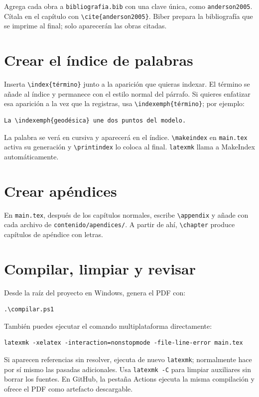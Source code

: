 Agrega cada obra a \texttt{bibliografia.bib} con una clave única, como \texttt{anderson2005}. Cítala en el capítulo con \verb|\cite{anderson2005}|. Biber prepara la bibliografía que se imprime al final; solo aparecerán las obras citadas.

\section{Crear el índice de palabras}

Inserta \verb|\index{término}| junto a la aparición que quieras indexar. El término se añade al índice y permanece con el estilo normal del párrafo. Si quieres enfatizar esa aparición a la vez que la registras, usa \verb|\indexemph{término}|; por ejemplo:

\begin{verbatim}
La \indexemph{geodésica} une dos puntos del modelo.
\end{verbatim}

La palabra se verá en cursiva y aparecerá en el índice. \verb|\makeindex| en \texttt{main.tex} activa su generación y \verb|\printindex| lo coloca al final. \texttt{latexmk} llama a MakeIndex automáticamente.

\section{Crear apéndices}

En \texttt{main.tex}, después de los capítulos normales, escribe \verb|\appendix| y añade con \verb|| cada archivo de \texttt{contenido/apendices/}. A partir de ahí, \verb|\chapter| produce capítulos de apéndice con letras.

\section{Compilar, limpiar y revisar}

Desde la raíz del proyecto en Windows, genera el PDF con:

\begin{verbatim}
.\compilar.ps1
\end{verbatim}

También puedes ejecutar el comando multiplataforma directamente:

\begin{verbatim}
latexmk -xelatex -interaction=nonstopmode -file-line-error main.tex
\end{verbatim}

Si aparecen referencias sin resolver, ejecuta de nuevo \texttt{latexmk}; normalmente hace por sí mismo las pasadas adicionales. Usa \texttt{latexmk -C} para limpiar auxiliares sin borrar los fuentes. En GitHub, la pestaña Actions ejecuta la misma compilación y ofrece el PDF como artefacto descargable.
